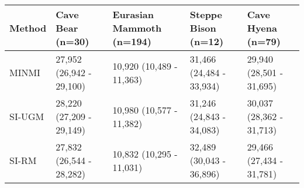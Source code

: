 
\begin{tabular}{lllll}
\toprule
Method & Cave Bear (n=30) & Eurasian Mammoth (n=194) & Steppe Bison (n=12) & Cave Hyena (n=79)\\
\midrule
MINMI & 27,952 (26,942 - 29,100) & 10,920 (10,489 - 11,363) & 31,466 (24,484 - 33,934) & 29,940 (28,501 - 31,695)\\
SI-UGM & 28,220 (27,209 - 29,149) & 10,980 (10,577 - 11,382) & 31,246 (24,843 - 34,083) & 30,037 (28,362 - 31,713)\\
SI-RM & 27,832 (26,544 - 28,282) & 10,832 (10,295 - 11,031) & 32,489 (30,043 - 36,896) & 29,466 (27,434 - 31,781)\\
\bottomrule
\end{tabular}
